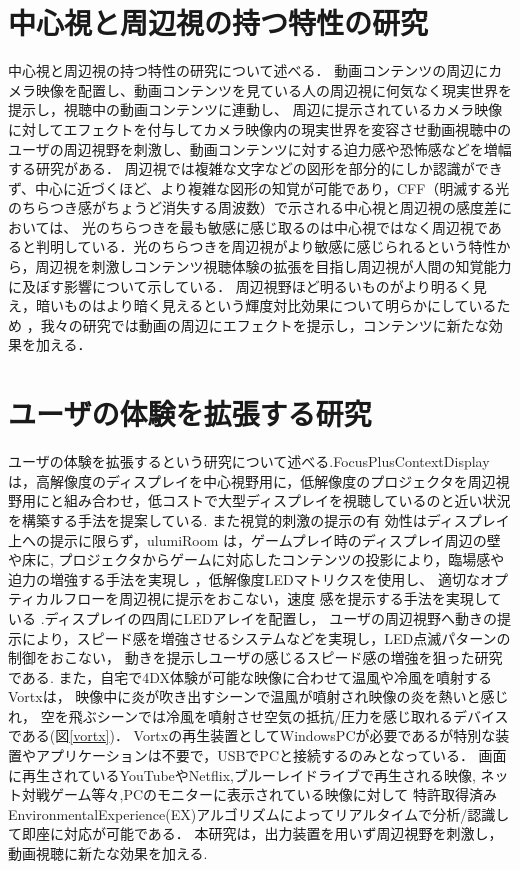 \section{中心視と周辺視の持つ特性の研究}
中心視と周辺視の持つ特性の研究について述べる．
動画コンテンツの周辺にカメラ映像を配置し、動画コンテンツを見ている人の周辺視に何気なく現実世界を提示し，視聴中の動画コンテンツに連動し、
周辺に提示されているカメラ映像に対してエフェクトを付与してカメラ映像内の現実世界を変容させ動画視聴中のユーザの周辺視野を刺激し、動画コンテンツに対する迫力感や恐怖感などを増幅する研究がある\cite{shamo4}．
周辺視では複雑な文字などの図形を部分的にしか認識ができず、中心に近づくほど、より複雑な図形の知覚が可能であり\cite{shamo5}，CFF（明滅する光のちらつき感がちょうど消失する周波数）で示される中心視と周辺視の感度差においては、
光のちらつきを最も敏感に感じ取るのは中心視ではなく周辺視であると判明している\cite{shamo6}．光のちらつきを周辺視がより敏感に感じられるという特性から，周辺視を刺激しコンテンツ視聴体験の拡張を目指し周辺視が人間の知覚能力に及ぼす影響について示している\cite{shamo7}．
周辺視野ほど明るいものがより明るく見え，暗いものはより暗く見えるという輝度対比効果について明らかにしているため \cite{shamo8}，我々の研究では動画の周辺にエフェクトを提示し，コンテンツに新たな効果を加える．

\section{ユーザの体験を拡張する研究}     
ユーザの体験を拡張するという研究について述べる.FocusPlusContextDisplayは，高解像度のディスプレイを中心視野用に，低解像度のプロジェクタを周辺視野用にと組み合わせ，低コストで大型ディスプレイを視聴しているのと近い状況を構築する手法を提案している\cite{shamo9}.
また視覚的刺激の提示の有 効性はディスプレイ上への提示に限らず，ulumiRoom は，ゲームプレイ時のディスプレイ周辺の壁や床に,
プロジェクタからゲームに対応したコンテンツの投影により，臨場感や迫力の増強する手法を実現し \cite{shamo10}，低解像度LEDマトリクスを使用し、
適切なオプティカルフローを周辺視に提示をおこない，速度 感を提示する手法を実現している \cite{shamo11}.ディスプレイの四周にLEDアレイを配置し，
ユーザの周辺視野へ動きの提示により，スピード感を増強させるシステムなどを実現し，LED点滅パターンの制御をおこない，
動きを提示しユーザの感じるスピード感の増強を狙った研究である\cite{shamo12}.
また，自宅で4DX体験が可能な映像に合わせて温風や冷風を噴射するVortxは，
映像中に炎が吹き出すシーンで温風が噴射され映像の炎を熱いと感じれ，
空を飛ぶシーンでは冷風を噴射させ空気の抵抗/圧力を感じ取れるデバイスである(図\ref{vortx})．
Vortxの再生装置としてWindowsPCが必要であるが特別な装置やアプリケーションは不要で，USBでPCと接続するのみとなっている．
画面に再生されているYouTubeやNetflix,ブルーレイドライブで再生される映像,
ネット対戦ゲーム等々,PCのモニターに表示されている映像に対して
特許取得済みEnvironmentalExperience(EX)アルゴリズムによってリアルタイムで分析/認識して即座に対応が可能である\cite{vortx}．
本研究は，出力装置を用いず周辺視野を刺激し，動画視聴に新たな効果を加える. 

